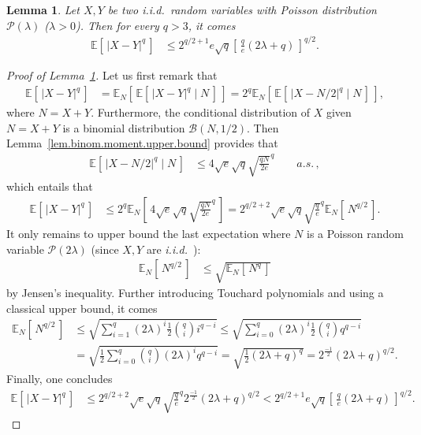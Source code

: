 \documentclass[twoside,11pt]{article}
\numberwithin{equation}{section}
\newtheorem{lem}{Lemma}[section]
\newcommand{\1}{\mathds{1}}%
\newcommand{\paren}[1]{\left( #1 \right)}
\newcommand{\croch}[1]{\left[\, #1 \,\right]}
\newcommand{\abs}[1]{\left\lvert #1 \right\rvert} %
\newcommand{\iid}{\textit{i.i.d.}\ }
\newcommand{\E}{\mathbb{E}}
\numberwithin{equation}{section}
\theoremstyle{plain}
\begin{document}
\medskip



\begin{lem}
  \label{lem.diff.poisson}
%
Let $X,Y$ be two \iid random variables with Poisson distribution $\mathcal{P}(\lambda)$ ($\lambda>0$).
%
Then for every $q>3$, it comes
\begin{align*}
  \E\croch{ \abs{ X - Y}^q } & \leq  2^{q/2+1} e \sqrt{q} \croch{\frac{q}{e} \paren{2\lambda + q} }^{q/2} .
\end{align*}

\end{lem}


\begin{proof}[Proof of Lemma~\ref{lem.diff.poisson}]
%
Let us first remark that
\begin{align*}
  \E\croch{ \abs{ X - Y}^q } & = \E_N\croch{ \E\croch{ \abs{ X - Y}^q \mid N} }  = 2^q \E_N\croch{ \E\croch{ \abs{ X - N/2 }^q \mid N} } ,
\end{align*}
 where $N=X+Y$.
%
Furthermore, the conditional distribution of $X$ given $N=X+Y$ is a binomial distribution $\mathcal{B}(N,1/2)$.
%
Then Lemma~\ref{lem.binom.moment.upper.bound} provides that
\begin{align*}
  \E\croch{ \abs{ X - N/2 }^q \mid N} & \leq 4\sqrt{ e } \sqrt{q } \sqrt{\frac{qN}{2e}}^{q} \qquad a.s.\,,
\end{align*}
%
which entails that
\begin{align*}
  \E\croch{ \abs{ X - Y}^q } & \leq 2^q \E_N\croch{4\sqrt{ e } \sqrt{q } \sqrt{\frac{qN}{2e}}^{q}} = 2^{q/2+2} \sqrt{ e } \sqrt{q} \sqrt{\frac{q}{e}}^{q} \E_N\croch{ N^{q/2} } .
\end{align*}
%
It only remains to upper bound the last expectation where $N$ is a Poisson random variable $\mathcal{P}(2\lambda)$ (since $X,Y$ are \iid):
\begin{align*}
  \E_N\croch{ N^{q/2} } & \leq \sqrt{  \E_N\croch{ N^{q} } }
\end{align*}
by Jensen's inequality.
%
Further introducing Touchard polynomials and using a classical upper bound, it comes
\begin{align*}
  \E_N\croch{ N^{q/2} } & \leq \sqrt{ \sum_{i=1}^q (2\lambda)^i  \frac{1}{2} {q\choose i } i^{q-i} } \leq \sqrt{ \sum_{i=0}^q (2\lambda)^i  \frac{1}{2} {q\choose i } q^{q-i} } \\
%
& = \sqrt{ \frac{1}{2} \sum_{i=0}^q {q\choose i } (2\lambda)^i    q^{q-i} } =  \sqrt{ \frac{1}{2} \paren{2\lambda + q }^q }  =   2^{\frac{-1}{2}} \paren{2\lambda + q }^{q/2} .
\end{align*}
%
Finally, one concludes
\begin{align*}
\E\croch{ \abs{ X - Y}^q } & \leq
 2^{q/2+2} \sqrt{ e } \sqrt{q} \sqrt{\frac{q}{e}}^{q}     2^{\frac{-1}{2}} \paren{2\lambda + q }^{q/2} <
 2^{q/2+1} e \sqrt{q} \croch{\frac{q}{e} \paren{2\lambda + q} }^{q/2} .
\end{align*}





\end{proof}




%


\end{document}
